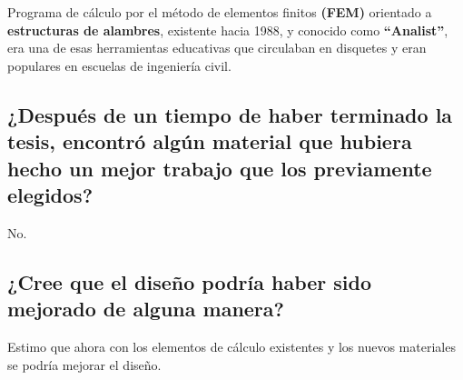 \documentclass[15pt,a4paper]{article}
\begin{document}
Programa de cálculo por el método de elementos finitos \textbf{(FEM)} orientado a \textbf{estructuras de alambres}, existente hacia 1988, y conocido como \textbf{\enquote{Analist}}, era una de esas herramientas educativas que circulaban en disquetes y eran populares en escuelas de ingeniería civil.

\subsection{¿Después de un tiempo de haber terminado la tesis, encontró algún material que hubiera hecho un mejor trabajo que los previamente elegidos?}

No.

\subsection{¿Cree que el diseño podría haber sido mejorado de alguna manera?}

Estimo que ahora con los elementos de cálculo existentes y los nuevos materiales se podría mejorar el diseño.
\end{document}
